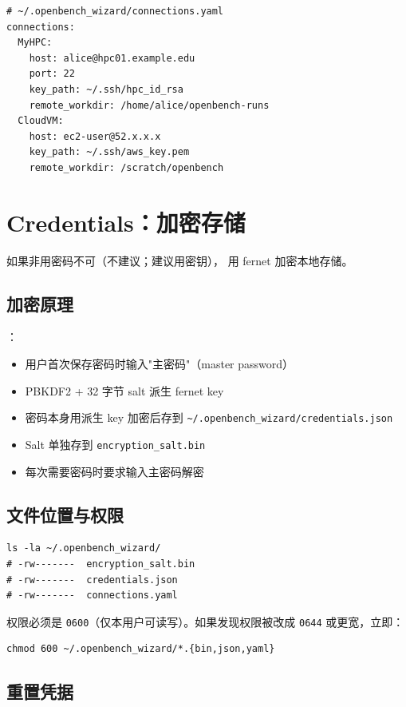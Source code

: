 \begin{verbatim}
# ~/.openbench_wizard/connections.yaml
connections:
  MyHPC:
    host: alice@hpc01.example.edu
    port: 22
    key_path: ~/.ssh/hpc_id_rsa
    remote_workdir: /home/alice/openbench-runs
  CloudVM:
    host: ec2-user@52.x.x.x
    key_path: ~/.ssh/aws_key.pem
    remote_workdir: /scratch/openbench
\end{verbatim}

\section{Credentials：加密存储}

如果非用密码不可（不建议；建议用密钥），\openbench{} 用 fernet 加密本地存储。

\subsection{加密原理}

：

\begin{itemize}
  \item 用户首次保存密码时输入"主密码"（master password）
  \item PBKDF2 + 32 字节 salt 派生 fernet key
  \item 密码本身用派生 key 加密后存到 \texttt{\~{}/.openbench\_wizard/credentials.json}
  \item Salt 单独存到 \texttt{encryption\_salt.bin}
  \item 每次需要密码时要求输入主密码解密
\end{itemize}

\subsection{文件位置与权限}

\begin{verbatim}
ls -la ~/.openbench_wizard/
# -rw-------  encryption_salt.bin
# -rw-------  credentials.json
# -rw-------  connections.yaml
\end{verbatim}

权限必须是 \texttt{0600}（仅本用户可读写）。如果发现权限被改成 \texttt{0644} 或更宽，立即：

\begin{verbatim}
chmod 600 ~/.openbench_wizard/*.{bin,json,yaml}
\end{verbatim}

\subsection{重置凭据}

